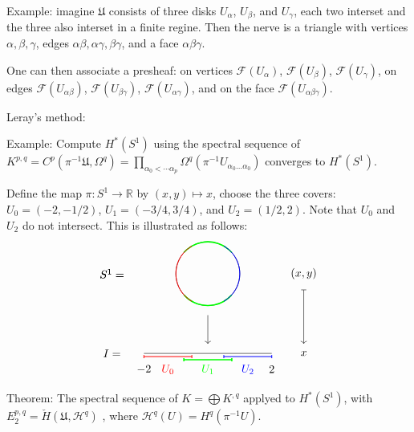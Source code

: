 \documentclass{article}
\theoremstyle{mystyle}
\theoremstyle{remark}
\numberwithin{equation}{section}
\begin{document}
Example: imagine $\mathfrak{U}$ consists of three disks $U_\alpha$, $U_\beta$, and $U_\gamma$, each two interset and the three also interset in a finite regine. Then the nerve is a triangle with vertices $\alpha,\beta,\gamma$, edges $\alpha\beta,\alpha\gamma,\beta\gamma$, and a face $\alpha\beta\gamma$.

One can then associate a presheaf: on vertices $\mathcal{F}(U_\alpha)$, $\mathcal{F}(U_\beta)$, $\mathcal{F}(U_\gamma)$, on edges $\mathcal{F}(U_{\alpha\beta})$, $\mathcal{F}(U_{\beta\gamma})$, $\mathcal{F}(U_{\alpha\gamma})$, and on the face $\mathcal{F}(U_{\alpha\beta\gamma})$. 

Leray's method:

Example: Compute $H^*(S^1)$ using the spectral sequence of $K^{p,q} = C^p(\pi^{-1}\mathfrak{U},\Omega^q) = \prod_{\alpha_0<\cdots \alpha_p}\Omega^q(\pi^{-1}U_{\alpha_0...\alpha_0})
$ converges to $H^*(S^1)$. 

Define the map $\pi\colon S^1\rightarrow \mathbb{R}$ by $(x,y)\mapsto x$, choose the three covers: $U_0 =(-2,-1/2)$, $U_1 = (-3/4,3/4)$, and $U_2 = (1/2,2)$. Note that $U_0$ and $U_2$ do not intersect. This is illustrated as follows:
$$
\begin{tikzpicture}
\draw (-2,0)--(2,0);
\draw (0,2.5) circle (1);
\draw[->] (0,1.2) -- (0,0.3);
\draw[|->] (3,2) -- (3,0.3);
\node () at (3,2.5) {$(x,y)$};
\node () at (3,0) {$x$};
\node () at (-3,2.5) {$S^1=$};
\node () at (-3,2.5) {$S^1=$};
\node () at (-3,0) {$I=$};
\node () at (-2,-0.5) {$-2$};
\node () at (2,-0.5) {$2$};
\draw[green,line width=0.4mm] (-3/4,-0.66143782776+2.5) arc (270-48.59:270+48.59:1);
\draw[green,line width=0.4mm] (3/4,0.66143782776+2.5) arc (90-48.59:90+48.59:1);
\draw[red,line width=0.25mm] (-1/2,2.5+0.866) arc (120:240:1);
\draw[blue,line width=0.25mm] (1/2,2.5+0.866) arc (60:-60:1);
\draw[red,line width=0.25mm] (-2,-0.1)--(-1/2,-0.1);
\draw[red,line width=0.25mm] (-2,-0.15)--(-2,-0.05);
\draw[red,line width=0.25mm] (-1/2,-0.15)--(-1/2,-0.05);
\draw[blue,line width=0.25mm] (2,-0.1)--(1/2,-0.1);
\draw[blue,line width=0.25mm] (2,-0.15)--(2,-0.05);
\draw[blue,line width=0.25mm] (1/2,-0.15)--(1/2,-0.05);
\draw[green,line width=0.4mm] (-3/4,-0.2)--(3/4,-0.2);
\draw[green,line width=0.4mm] (-3/4,-0.25)--(-3/4,-0.15);
\draw[green,line width=0.4mm] (3/4,-0.25)--(3/4,-0.15);
\node[red] () at (-5/4,-0.5) {$U_0$};
\node[green] () at (0,-0.5) {$U_1$};
\node[blue] () at (5/4,-0.5) {$U_2$};
\end{tikzpicture}
$$


Theorem: The spectral sequence of $K=\bigoplus K^{,q}$ applyed to $H^*(S^1)$, with $E^{p,q}_2 = \check{H}(\mathfrak{U},\mathcal{H}^q)$ , where $\mathcal{H}^q(U) = H^q(\pi^{-1}U)$.
\end{document}
